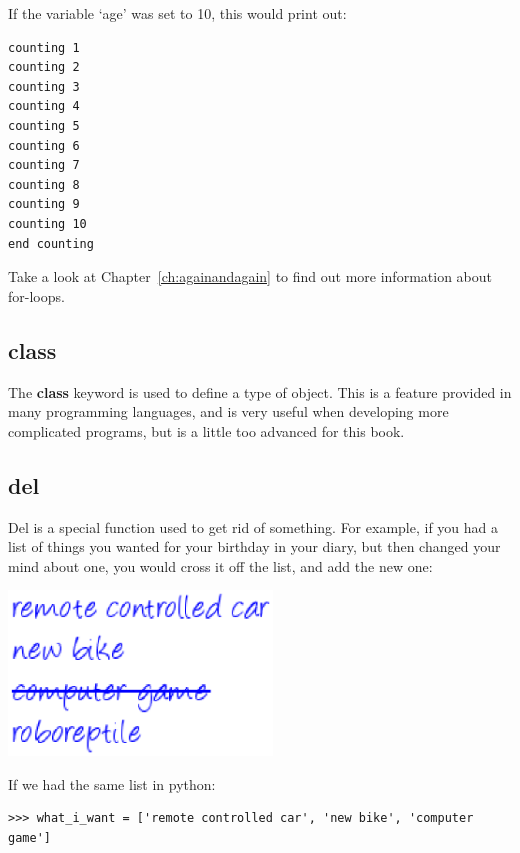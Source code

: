 \noindent
If the variable `age' was set to 10, this would print out:

\begin{listing}
\begin{verbatim}
counting 1
counting 2
counting 3
counting 4
counting 5
counting 6
counting 7
counting 8
counting 9
counting 10
end counting
\end{verbatim}
\end{listing}

\noindent
Take a look at Chapter~\ref{ch:againandagain} to find out more information about for-loops.

\subsection*{class}

The \textbf{class} keyword is used to define a type of object. This is a feature provided in many programming languages, and is very useful when developing more complicated programs, but is a little too advanced for this book.

\subsection*{del}

Del is a special function used to get rid of something. For example, if you had a list of things you wanted for your birthday in your diary, but then changed your mind about one, you would cross it off the list, and add the new one:

\begin{center}
\includegraphics*[width=70mm]{eps/list.eps}
\end{center}

\noindent
If we had the same list in python:

\begin{listing}
\begin{verbatim}
>>> what_i_want = ['remote controlled car', 'new bike', 'computer game']
\end{verbatim}
\end{listing}


